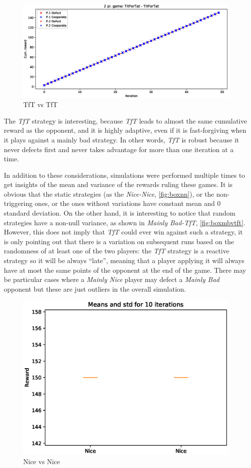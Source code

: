 \documentclass[journal,10pt,twoside]{IEEEtran}
\begin{document}
\begin{figure}[!ht]
    \centering
    \includegraphics[width=.9\columnwidth]{../img/ipd2p/ipd2p-rewards-TitForTat-TitForTat}
    \caption{TfT vs TfT}
    \label{fig:tftvstft}
\end{figure}

The \textit{TfT} strategy is interesting, because \textit{TfT} leads to almost the same cumulative reward as the opponent, and it is highly adaptive, even if it is fast-forgiving when it plays against a mainly bad strategy. In other words, \textit{TfT} is robust because it never defects first and never takes advantage for more than one iteration at a time.~\cite{fogelEvolvingBehaviors}

In addition to these considerations, simulations were performed multiple times to get insights of the mean and variance of the rewards ruling these games. It is obvious that the static strategies (as the \textit{Nice-Nice}, \autoref{fig:boxnn}), or the non-triggering ones, or the ones without variations have constant mean and 0 standard deviation. On the other hand, it is interesting to notice that random strategies have a non-null variance, as shown in \textit{Mainly Bad-TfT}, \autoref{fig:boxmbvtft}. However, this does not imply that \textit{TfT} could ever win against such a strategy, it is only pointing out that there is a variation on subsequent runs based on the randomness of at least one of the two players: the \textit{TfT} strategy is a reactive strategy so it will be always ``late'', meaning that a player applying it will always have at most the same points of the opponent at the end of the game. There may be particular cases where a \textit{Mainly Nice} player may defect a \textit{Mainly Bad} opponent but these are just outliers in the overall simulation.

\begin{figure}[!ht]
    \centering
    \includegraphics[width=.7\columnwidth]{../img/ipd2p/ipd2p-boxplot-Nice-Nice}
    \caption{Nice vs Nice}
    \label{fig:boxnn}
\end{figure}
\end{document}
